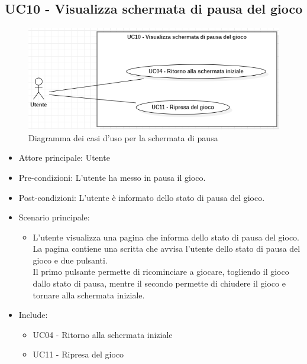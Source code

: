 \subsection{UC10 - Visualizza schermata di pausa del gioco}
\begin{figure}[h]
    \centering
    \includegraphics[width=400pt]{images/usecase/UC10.png}
    \caption{Diagramma dei casi d'uso per la schermata di pausa}
    \label{fig:UC10}
\end{figure}
\begin{itemize}
    \item Attore principale: Utente
    \item Pre-condizioni: L'utente ha messo in pausa il gioco.
    \item Post-condizioni: L'utente è informato dello stato di pausa del gioco.
    \item Scenario principale: \begin{itemize}
        \item L'utente visualizza una pagina che informa dello stato di pausa del gioco.\\ La pagina contiene una scritta che avvisa l'utente dello stato di pausa del gioco e due pulsanti.\\ Il primo pulsante permette di ricominciare a giocare, togliendo il gioco dallo stato di pausa, mentre il secondo permette di chiudere il gioco e tornare alla schermata iniziale.
    \end{itemize}
    \item Include: \begin{itemize}
        \item UC04 - Ritorno alla schermata iniziale
        \item UC11 - Ripresa del gioco
    \end{itemize}
\end{itemize}

